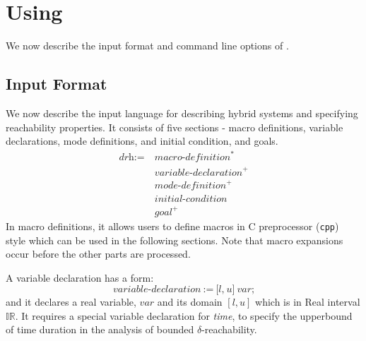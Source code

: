 \section{Using \dReach{}}\label{sec:using-dreach}

We now describe the input format and command line options of \dReach{}. 

\subsection{Input Format}\label{sec:input-format}

We now describe the input language for describing hybrid systems and
specifying reachability properties. It consists of five sections
- macro definitions, variable declarations, mode definitions, and
initial condition, and goals.
\begin{align*}
  \textit{drh} := \ & \textit{macro-definition}^*\\
                    & \textit{variable-declaration}^+\\
                    & \textit{mode-definition}^+\\
                    & \textit{initial-condition}\\
                    & \textit{goal}^+
\end{align*}
In macro definitions, it allows users to define macros in C
preprocessor (\texttt{cpp}) style which can be used in the following
sections. Note that macro expansions occur before the other parts are processed.

A variable declaration has a form:
\[
\textit{variable-declaration} \ := \ \texttt{[}
                                     \textit{l}
                                     \texttt{,}
                                     \ \textit{u}
                                     \texttt{]}
                                     \ \textit{var}
                                     \texttt{;}
\]
and it declares a real variable, $var$ and its domain $[l, u]$ which
is in Real interval $\mathbb{IR}$. It requires a special variable
declaration for \textit{time}, to specify the upperbound of time
duration in the analysis of bounded $\delta$-reachability.

